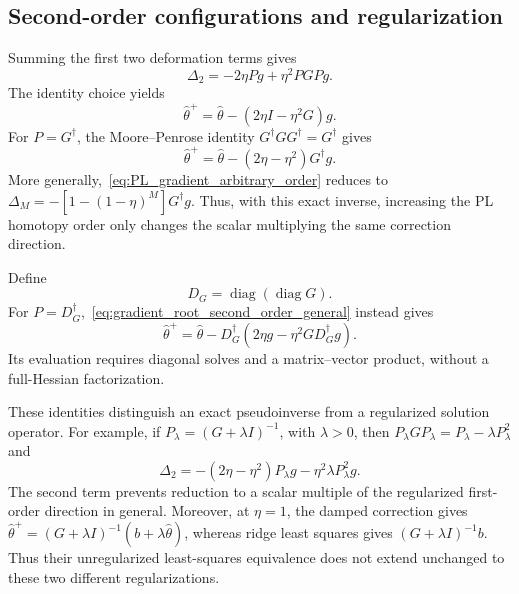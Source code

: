 \subsection{Second-order configurations and regularization}

Summing the first two deformation terms gives
\begin{equation}
\label{eq:gradient_root_second_order_general}
    \Delta_2=-2\eta Pg+\eta^2PGPg.
\end{equation}
The identity choice yields
\begin{equation}
\label{eq:GGHAM2_identity}
    \hat\theta^+=\hat\theta-(2\eta I-\eta^2G)g.
\end{equation}
For $P=G^\dagger$, the Moore--Penrose identity
$G^\dagger GG^\dagger=G^\dagger$ gives
\begin{equation}
\label{eq:GGHAM2_hessian}
    \hat\theta^+=\hat\theta-(2\eta-\eta^2)G^\dagger g.
\end{equation}
More generally,~\eqref{eq:PL_gradient_arbitrary_order} reduces to
$\Delta_M=-[1-(1-\eta)^M]G^\dagger g$.
Thus, with this exact inverse, increasing the PL homotopy order only
changes the scalar multiplying the same correction direction.

Define
\begin{equation}
\label{eq:DG_definition}
    D_G=\operatorname{diag}(\operatorname{diag}G).
\end{equation}
For $P=D_G^\dagger$,~\eqref{eq:gradient_root_second_order_general}
instead gives
\begin{equation}
\label{eq:GGHAM2_diag_hessian}
    \hat\theta^+=\hat\theta-
    D_G^\dagger(2\eta g-\eta^2GD_G^\dagger g).
\end{equation}
Its evaluation requires diagonal solves and a matrix--vector product,
without a full-Hessian factorization.

These identities distinguish an exact pseudoinverse from a regularized
solution operator. For example, if $P_\lambda=(G+\lambda I)^{-1}$,
with $\lambda>0$, then $P_\lambda GP_\lambda=P_\lambda-\lambda P_\lambda^2$
and
\begin{equation}
\label{eq:PL_regularized_second_order}
    \Delta_2=-(2\eta-\eta^2)P_\lambda g
             -\eta^2\lambda P_\lambda^2g.
\end{equation}
The second term prevents reduction to a scalar multiple of the
regularized first-order direction in general. Moreover, at $\eta=1$,
the damped correction gives
$\hat\theta^+=(G+\lambda I)^{-1}(b+\lambda\hat\theta)$,
whereas ridge least squares gives $(G+\lambda I)^{-1}b$.
Thus their unregularized least-squares equivalence does not extend
unchanged to these two different regularizations.

